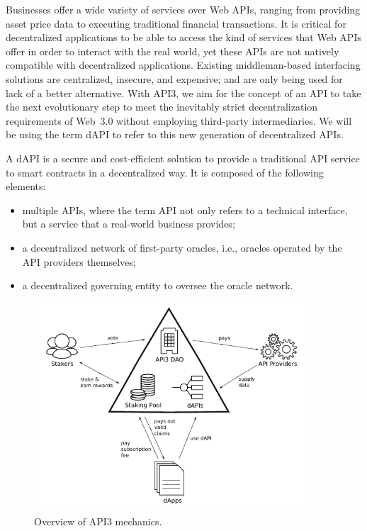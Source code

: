 \documentclass[11pt]{article}
\begin{document}
Businesses offer a wide variety of services over Web APIs, ranging from providing asset price data to executing traditional financial transactions.
It is critical for decentralized applications to be able to access the kind of services that Web APIs offer in order to interact with the real world, yet these APIs are not natively compatible with decentralized applications.
Existing middleman-based interfacing solutions are centralized, insecure, and expensive; and are only being used for lack of a better alternative.
With API3, we aim for the concept of an API to take the next evolutionary step to meet the inevitably strict decentralization requirements of Web~3.0 without employing third-party intermediaries.
We will be using the term dAPI to refer to this new generation of decentralized APIs.

A dAPI is a secure and cost-efficient solution to provide a traditional API service to smart contracts in a decentralized way.
It is composed of the following elements:
\begin{itemize}
    \item multiple APIs, where the term API not only refers to a technical interface, but a service that a real-world business provides;
    \item a decentralized network of first-party oracles, i.e., oracles operated by the API providers themselves;
    \item a decentralized governing entity to oversee the oracle network.
\end{itemize}

\begin{figure}[!t]
    \centering
    \includegraphics[width=0.9\textwidth]{fig/teaser/teaser}
	\caption{Overview of API3 mechanics.}
	\label{fig:teaser}
\end{figure}
\end{document}
